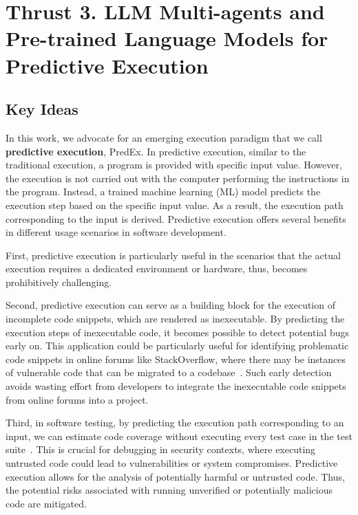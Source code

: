\section{Thrust 3. LLM Multi-agents and Pre-trained Language Models for Predictive Execution}
\label{sec:thrust3}

\subsection{Key Ideas}

In this work, we advocate for an emerging execution paradigm that we
call {\bf predictive execution}, PredEx. In predictive execution,
similar to the traditional execution, a program is provided with
specific input value. However, the execution is not carried out with
the computer performing the instructions in the program. Instead, a
trained machine learning (ML) model predicts the execution step based
on the specific input value. As a result, the execution path
corresponding to the input is derived. Predictive execution offers
several benefits in different usage scenarios in software development.

First, predictive execution is particularly useful in the scenarios
that the actual execution requires a dedicated environment or
hardware, thus, becomes prohibitively challenging. 

Second, predictive execution can serve as a building block for the
execution of incomplete code snippets, which are rendered as
inexecutable. By predicting the execution steps of inexecutable code,
it becomes possible to detect potential bugs early on. This
application could be particularly useful for identifying problematic
code snippets in online forums like StackOverflow, where there may be
instances of vulnerable code that can be migrated to a
codebase~\cite{verdi-tse22}. Such early detection avoids wasting
effort from developers to integrate the inexecutable code snippets
from online forums into a project.

Third, in software testing, by predicting the execution path
corresponding to an input, we can estimate code coverage without
executing every test case in the test
suite~\cite{ball-toplas94,elbaum-icsm01}. This is crucial for
debugging in security contexts, where executing untrusted code could
lead to vulnerabilities or system compromises. Predictive execution
allows for the analysis of potentially harmful or untrusted
code. Thus, the potential risks associated with running unverified or
potentially malicious code are mitigated.


